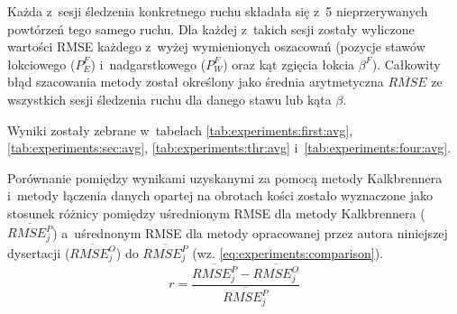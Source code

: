 Każda z~sesji śledzenia konkretnego ruchu składała się z~5 nieprzerywanych powtórzeń tego samego ruchu. Dla każdej z~takich sesji zostały wyliczone wartości RMSE każdego z~wyżej wymienionych oszacowań (pozycje stawów łokciowego ($P^F_E$) i~nadgarstkowego ($P^F_W$) oraz kąt zgięcia łokcia $\beta^F$). Całkowity błąd szacowania metody został określony jako średnia arytmetyczna $\overline{RMSE}$ ze wszystkich sesji śledzenia ruchu dla danego stawu lub kąta $\beta$.

Wyniki zostały zebrane w~tabelach \ref{tab:experiments:first:avg}, \ref{tab:experiments:sec:avg}, \ref{tab:experiments:thr:avg} i~\ref{tab:experiments:four:avg}.


Porównanie pomiędzy wynikami uzyskanymi za pomocą metody Kalkbrennera i~metody łączenia danych opartej na obrotach kości zostało wyznaczone jako stosunek różnicy pomiędzy uśrednionym RMSE dla metody Kalkbrennera ($\overline{RMSE^P_j}$) a~uśrednonym RMSE dla metody opracowanej przez autora niniejszej dysertacji ($\overline{RMSE^O_j}$) do $\overline{RMSE^P_j}$ (wz. \eqref{eq:experiments:comparison}).\\
\begin{equation}
	r = \frac{\overline{RMSE^P_j} - \overline{RMSE^O_j}}{\overline{RMSE^P_j}}
	\label{eq:experiments:comparison}
\end{equation}


